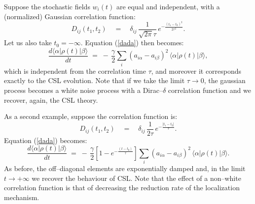 \documentclass[10pt,a4paper]{article}
\begin{document}
Suppose the stochastic fields $w_{i}(t)$ are equal and
independent, with a (normalized) Gaussian correlation function:
\begin{equation} \label{gcf}
D_{ij}(t_{1},t_{2}) \quad = \quad \delta_{ij}\,
\frac{1}{\sqrt{2\pi}\tau}\,e^{\displaystyle - \frac{(t_{1} -
t_{2})^{2}}{2\tau^{2}}}.
\end{equation}
Let us also take $t_{0} = -\infty$. Equation (\ref{dada}) then
becomes:
\begin{equation} \label{dadae1}
\frac{d \langle\alpha|\rho(t)|\beta\rangle}{dt} \; = \; - \,
\frac{\gamma}{2} \sum_{i} (a_{i\alpha} - a_{i\beta})^{2} \,
\langle\alpha|\rho(t)|\beta\rangle,
\end{equation}
which is independent from the correlation time $\tau$, and
moreover it corresponds exactly to the CSL evolution. Note that if
we take the limit $\tau \rightarrow 0$, the gaussian process
becomes a white noise process with a Dirac--$\delta$ correlation
function and we recover, again, the CSL theory.

As a second example, suppose the correlation function is:
\begin{equation} \label{gcf2}
D_{ij}(t_{1},t_{2}) \quad = \quad \delta_{ij}\,
\frac{1}{2\tau}\,e^{\displaystyle - \frac{|t_{1} - t_{2}|}{\tau}}.
\end{equation}
Equation (\ref{dada}) becomes:
\begin{equation} \label{dadae2}
\frac{d \langle\alpha|\rho(t)|\beta\rangle}{dt} \; = \; - \,
\frac{\gamma}{2} \left[1- e^{\displaystyle -\frac{(t -
t_{0})}{\tau}}\right] \sum_{i} (a_{i\alpha} - a_{i\beta})^{2} \,
\langle\alpha|\rho(t)|\beta\rangle.
\end{equation}
As before, the off--diagonal elements are exponentially damped
and, in the limit $t \rightarrow +\infty$ we recover the behaviour
of CSL. Note that the effect of a non--white correlation function
is that of decreasing the reduction rate of the localization
mechanism.
\end{document}
